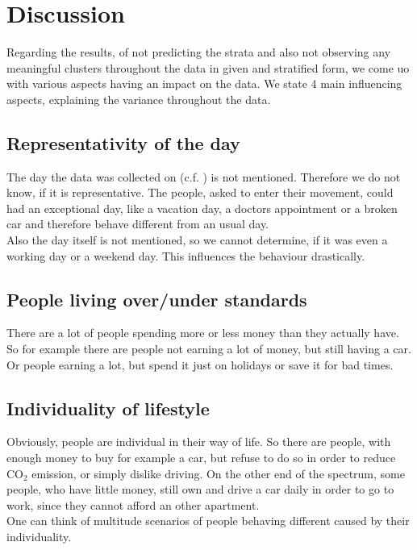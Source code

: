 	\section{Discussion} \label{sec: discussion}
	Regarding the results, of not predicting the strata and also not observing any meaningful clusters throughout the data in given and stratified form, we come uo with various aspects having an impact on the data. We state 4 main influencing aspects, explaining the variance throughout the data.
	
	\subsection{Representativity of the day}
	The day the data was collected on (c.f. ) is not mentioned. Therefore we do not know, if it is representative. The people, asked to enter their movement, could had an exceptional day, like a vacation day, a doctors appointment or a broken car and therefore behave different from an usual day. \\
	Also the day itself is not mentioned, so we cannot determine, if it was even a working day or a weekend day. This influences the behaviour drastically.
	
	\subsection{People living over/under standards}
	There are a lot of people spending more or less money than they actually have. So for example there are people not earning a lot of money, but still having a car. Or people earning a lot, but spend it just on holidays or save it for bad times.
	

	\subsection{Individuality of lifestyle}
	Obviously, people are individual in their way of life. So there are people, with enough money to buy for example a car, but refuse to do so in order to reduce CO$_2$ emission, or simply dislike driving. On the other end of the spectrum, some people, who have little money, still own and drive a car daily in order to go to work, since they cannot afford an other apartment.\\
	One can think of multitude scenarios of people behaving different caused by their individuality.
	
